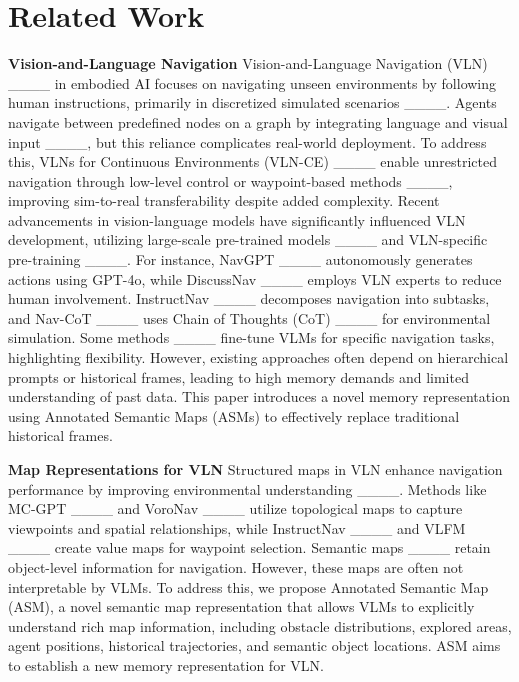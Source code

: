 \section{Related Work}
\label{sec2:related}
\textbf{Vision-and-Language Navigation}  
Vision-and-Language Navigation (VLN) ____ in embodied AI focuses on navigating unseen environments by following human instructions, primarily in discretized simulated scenarios ____. Agents navigate between predefined nodes on a graph by integrating language and visual input ____, but this reliance complicates real-world deployment.
To address this, VLNs for Continuous Environments (VLN-CE) ____ enable unrestricted navigation through low-level control or waypoint-based methods ____, improving sim-to-real transferability despite added complexity.
Recent advancements in vision-language models have significantly influenced VLN development, utilizing large-scale pre-trained models ____ and VLN-specific pre-training ____. For instance, NavGPT ____ autonomously generates actions using GPT-4o, while DiscussNav ____ employs VLN experts to reduce human involvement. InstructNav ____ decomposes navigation into subtasks, and Nav-CoT ____ uses Chain of Thoughts (CoT) ____ for environmental simulation. Some methods ____ fine-tune VLMs for specific navigation tasks, highlighting flexibility. However, existing approaches often depend on hierarchical prompts or historical frames, leading to high memory demands and limited understanding of past data.
This paper introduces a novel memory representation using Annotated Semantic Maps (ASMs) to effectively replace traditional historical frames.






\noindent\textbf{Map Representations for VLN} 
Structured maps in VLN enhance navigation performance by improving environmental understanding ____. 
Methods like MC-GPT ____ and VoroNav ____ utilize topological maps to capture viewpoints and spatial relationships, while InstructNav ____ and VLFM ____ create value maps for waypoint selection.
Semantic maps ____ retain object-level information for navigation. However, these maps are often not interpretable by VLMs.
To address this, we propose Annotated Semantic
Map (ASM), a novel semantic map representation that allows VLMs to explicitly understand rich map information, including obstacle distributions, explored areas, agent positions, historical trajectories, and semantic object locations. 
ASM aims to establish a new memory representation for VLN.



